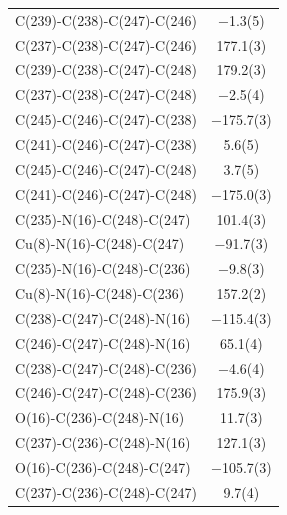 \begin{center}
{\begin{supertabular}{p{1.8in}c}
C(239)-C(238)-C(247)-C(246)&$-$1.3(5)\\
C(237)-C(238)-C(247)-C(246)&177.1(3)\\
C(239)-C(238)-C(247)-C(248)&179.2(3)\\
C(237)-C(238)-C(247)-C(248)&$-$2.5(4)\\
C(245)-C(246)-C(247)-C(238)&$-$175.7(3)\\
C(241)-C(246)-C(247)-C(238)&5.6(5)\\
C(245)-C(246)-C(247)-C(248)&3.7(5)\\
C(241)-C(246)-C(247)-C(248)&$-$175.0(3)\\
C(235)-N(16)-C(248)-C(247)&101.4(3)\\
Cu(8)-N(16)-C(248)-C(247)&$-$91.7(3)\\
C(235)-N(16)-C(248)-C(236)&$-$9.8(3)\\
Cu(8)-N(16)-C(248)-C(236)&157.2(2)\\
C(238)-C(247)-C(248)-N(16)&$-$115.4(3)\\
C(246)-C(247)-C(248)-N(16)&65.1(4)\\
C(238)-C(247)-C(248)-C(236)&$-$4.6(4)\\
C(246)-C(247)-C(248)-C(236)&175.9(3)\\
O(16)-C(236)-C(248)-N(16)&11.7(3)\\
C(237)-C(236)-C(248)-N(16)&127.1(3)\\
O(16)-C(236)-C(248)-C(247)&$-$105.7(3)\\
C(237)-C(236)-C(248)-C(247)&9.7(4)\\
\end{supertabular}
}
\end{center}



